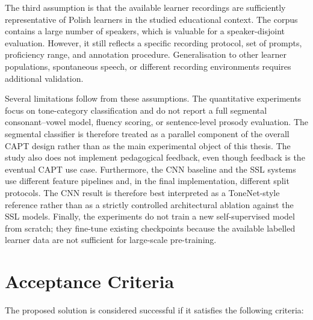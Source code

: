 The third assumption is that the available learner recordings are sufficiently
representative of Polish learners in the studied educational context. The corpus
contains a large number of speakers, which is valuable for a speaker-disjoint
evaluation. However, it still reflects a specific recording protocol, set of
prompts, proficiency range, and annotation procedure. Generalisation to other
learner populations, spontaneous speech, or different recording environments
requires additional validation.

Several limitations follow from these assumptions. The quantitative experiments
focus on tone-category classification and do not report a full segmental
consonant--vowel model, fluency scoring, or sentence-level prosody evaluation.
The segmental classifier is therefore treated as a parallel component of the
overall CAPT design rather than as the main experimental object of this thesis.
The study also does not implement pedagogical feedback, even though feedback is
the eventual CAPT use case. Furthermore, the CNN baseline and the SSL systems
use different feature pipelines and, in the final implementation, different
split protocols. The CNN result is therefore best interpreted as a ToneNet-style
reference rather than as a strictly controlled architectural ablation against the
SSL models. Finally, the experiments do not train a new self-supervised model
from scratch; they fine-tune existing checkpoints because the available labelled
learner data are not sufficient for large-scale pre-training.

\section{Acceptance Criteria}
\label{sec:proposal:criteria}

The proposed solution is considered successful if it satisfies the following
criteria:

